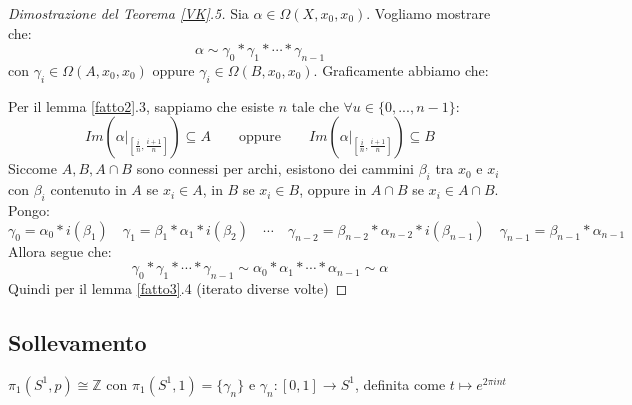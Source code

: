 \documentclass[11pt,a4paper,twoside]{article}
\theoremstyle{definition}
\begin{document}
\begin{proof}[Dimostrazione del Teorema \ref{VK}.5]
	Sia $\alpha \in \Omega(X, x_0, x_0)$. Vogliamo mostrare che:
	\[ \alpha \sim \gamma_0 * \gamma_1*\cdots * \gamma_{n-1} \]
	con $\gamma_i \in \Omega(A, x_0,x_0)$ oppure $\gamma_i \in \Omega(B, x_0, x_0)$. Graficamente abbiamo che:
	\begin{center}
	\end{center}
	Per il lemma \ref{fatto2}.3, sappiamo che esiste $n$ tale che $\forall u \in\{0,...,n-1\}$:
	\[Im\left( \left. \alpha \right|_{[\frac in, \frac{i+1}n]} \right)\subseteq A \qquad \text{oppure}\qquad Im\left( \left. \alpha \right|_{[\frac in, \frac{i+1}n]} \right)\subseteq B\]
	Siccome $A, B, A \cap B$ sono connessi per archi, esistono dei cammini $\beta_i$ tra $x_0$ e $x_i$ con $\beta_i$ contenuto in $A$ se $x_i \in A$, in $B$ se $x_i \in B$, oppure in $A \cap B$ se $x_i \in A \cap B$. Pongo:
	\[ \gamma_0 = \alpha_0 * i (\beta_1) \quad \gamma_1 = \beta_1 * \alpha_1 * i(\beta_2)\quad \cdots \quad \gamma_{n-2} = \beta_{n-2}*\alpha_{n-2}*i(\beta_{n-1}) \quad \gamma_{n-1} = \beta_{n-1} * \alpha_{n-1} \]
	Allora segue che:
	\[ \gamma_0 * \gamma_1 * \cdots * \gamma_{n-1} \sim \alpha_0 * \alpha_1 * \cdots * \alpha_{n-1} \sim \alpha \]
	Quindi per il lemma \ref{fatto3}.4 (iterato diverse volte)
\end{proof}

\subsection{Sollevamento}

\begin{thm}{}{}\label{molla}
	$\pi_1(S^1, p) \cong \mathbb Z$ con $\pi_1(S^1, 1) = \{\gamma_n\}$ e $\gamma_n:[0,1]\to S^1$, definita come $t\mapsto e^{2 \pi i nt}$
\end{thm}
\end{document}
